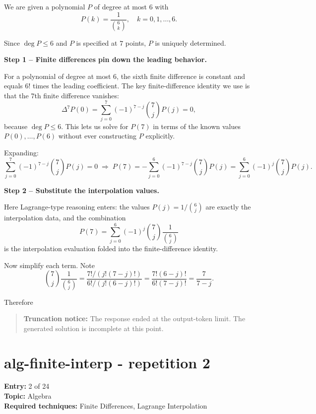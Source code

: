 \documentclass[
  11pt,
  letterpaper,
]{article}
\begin{document}
We are given a polynomial \(P\) of degree at most \(6\) with
\[P(k) = \frac{1}{\binom{6}{k}}, \quad k = 0,1,\dots,6.\]

Since \(\deg P \le 6\) and \(P\) is specified at \(7\) points, \(P\) is
uniquely determined.

\textbf{Step 1 -- Finite differences pin down the leading behavior.}

For a polynomial of degree at most \(6\), the sixth finite difference is
constant and equals \(6!\) times the leading coefficient. The key
finite-difference identity we use is that the \(7\)th finite difference
vanishes:
\[\Delta^7 P(0) = \sum_{j=0}^{7} (-1)^{7-j}\binom{7}{j} P(j) = 0,\]
because \(\deg P \le 6\). This lets us solve for \(P(7)\) in terms of
the known values \(P(0),\dots,P(6)\) without ever constructing \(P\)
explicitly.

Expanding: \[\sum_{j=0}^{7} (-1)^{7-j}\binom{7}{j} P(j) = 0
\;\Longrightarrow\;
P(7) = -\sum_{j=0}^{6} (-1)^{7-j}\binom{7}{j} P(j)
= \sum_{j=0}^{6} (-1)^{j}\binom{7}{j} P(j).\]

\textbf{Step 2 -- Substitute the interpolation values.}

Here Lagrange-type reasoning enters: the values
\(P(j) = 1/\binom{6}{j}\) are exactly the interpolation data, and the
combination
\[P(7) = \sum_{j=0}^{6} (-1)^{j}\binom{7}{j}\frac{1}{\binom{6}{j}}\] is
the interpolation evaluation folded into the finite-difference identity.

Now simplify each term. Note
\[\binom{7}{j}\frac{1}{\binom{6}{j}} = \frac{7!/(j!(7-j)!)}{6!/(j!(6-j)!)} = \frac{7!(6-j)!}{6!(7-j)!} = \frac{7}{7-j}.\]

Therefore

\begin{quote}
\textbf{Truncation notice:} The response ended at the output-token
limit. The generated solution is incomplete at this point.
\end{quote}

\clearpage

\section{alg-finite-interp - repetition
2}\label{alg-finite-interp---repetition-2}

\textbf{Entry:} 2 of 24\\
\textbf{Topic:} Algebra\\
\textbf{Required techniques:} Finite Differences, Lagrange Interpolation
\end{document}
